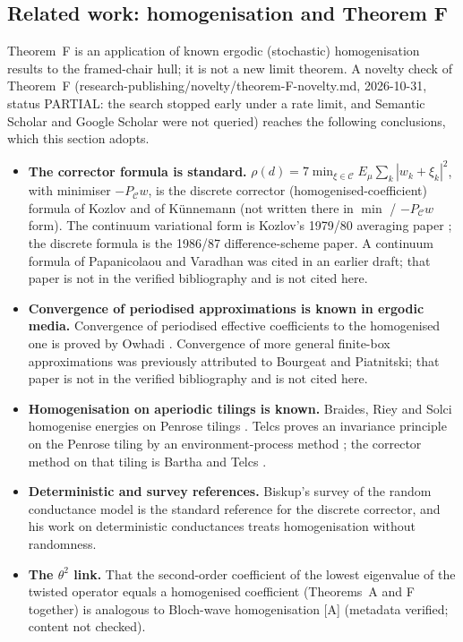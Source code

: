 \documentclass[11pt]{article}
\begin{document}
\subsection{Related work: homogenisation and Theorem F}\label{sec:relwork}
Theorem~F is an application of known ergodic (stochastic) homogenisation results to the framed-chair hull; it is not a new limit theorem. A novelty check of Theorem~F (research-publishing/novelty/theorem-F-novelty.md, 2026-10-31, status PARTIAL: the search stopped early under a rate limit, and Semantic Scholar and Google Scholar were not queried) reaches the following conclusions, which this section adopts.
\begin{itemize}\small
\item \textbf{The corrector formula is standard.} $\rho(d)=7\min_{\xi\in\mathcal C}E_\mu\sum_k|w_k+\xi_k|^2$, with minimiser $-P_{\mathcal C}w$, is the discrete corrector (homogenised-coefficient) formula of Kozlov \cite{kozlov1987difference} and of K\"unnemann \cite{kunnemann1983diffusion} (not written there in $\min$ / $-P_{\mathcal C}w$ form). The continuum variational form is Kozlov's 1979/80 averaging paper \cite{kozlov1980averaging}; the discrete formula is the 1986/87 difference-scheme paper. A continuum formula of Papanicolaou and Varadhan was cited in an earlier draft; that paper is not in the verified bibliography and is not cited here.
\item \textbf{Convergence of periodised approximations is known in ergodic media.} Convergence of periodised effective coefficients to the homogenised one is proved by Owhadi \cite{owhadi2003periodization}. Convergence of more general finite-box approximations was previously attributed to Bourgeat and Piatnitski; that paper is not in the verified bibliography and is not cited here.
\item \textbf{Homogenisation on aperiodic tilings is known.} Braides, Riey and Solci homogenise energies on Penrose tilings \cite{braides2009penrose}. Telcs proves an invariance principle on the Penrose tiling by an environment-process method \cite{telcs2010penrose}; the corrector method on that tiling is Bartha and Telcs \cite{bartha2013penrose}.
\item \textbf{Deterministic and survey references.} Biskup's survey of the random conductance model \cite{biskup2011survey} is the standard reference for the discrete corrector, and his work on deterministic conductances \cite{biskup2025deterministic} treats homogenisation without randomness.
\item \textbf{The $\theta^2$ link.} That the second-order coefficient of the lowest eigenvalue of the twisted operator equals a homogenised coefficient (Theorems~A and F together) is analogous to Bloch-wave homogenisation [A] \cite{conca1997bloch} (metadata verified; content not checked).
\end{itemize}
\end{document}
